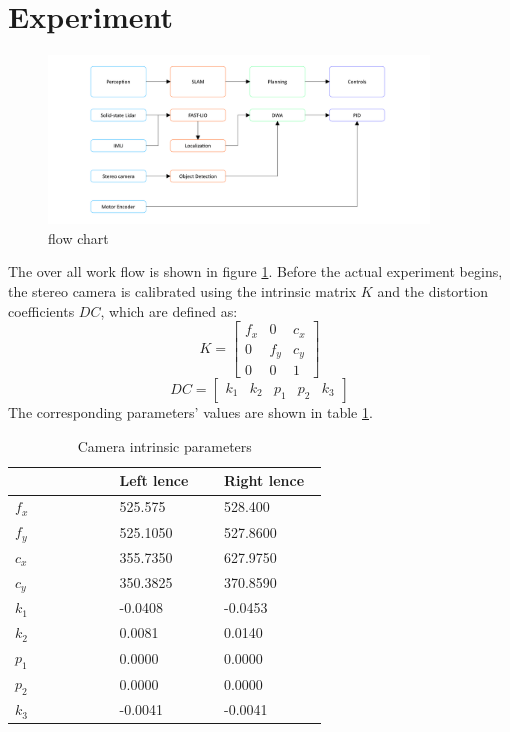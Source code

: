 \documentclass[balance,upint,subscriptcorrection,varvw,nofoot, mathalfa=cal=boondoxo,spanish,french,vietnamese,russian,greek,pdf-a,fontspec,colorlinks]{asmeconf}
\begin{document}
\section{Experiment}
\begin{figure}
	\center
	\includegraphics[width=0.9\textwidth]{flow_chart.png}
	\caption{flow chart}\label{flow}
	\end{figure}
The over all work flow is shown in figure \ref{flow}. Before the actual experiment begins, the stereo camera is calibrated using the intrinsic matrix $K$ and the distortion coefficients $DC$, which are defined as:
\begin{equation}
	K=\left[\begin{array}{ccc}f_{x} & 0 & c_{x} \\ 0 & f_{y} & c_{y} \\ 0 & 0 & 1\end{array}\right]
\end{equation}
\begin{equation}
	DC =\left[\begin{array}{lllll}k_{1} & k_{2} & p_{1} & p_{2} & k_{3}\end{array}\right]
\end{equation}
The corresponding parameters' values are shown in table \ref{calib}.

\begin{table}[!ht]
    \centering
    \begin{tabular}{p{0.3\linewidth} p{0.3\linewidth} p{0.3\linewidth}}
    \hline

	~ & Left lence & Right lence \\ \hline
	$f_x$ & 525.575 & 528.400 \\ 
	$f_y$ & 525.1050 & 527.8600 \\ 
	$c_x$ & 355.7350 & 627.9750 \\ 
	$c_y$ & 350.3825 & 370.8590 \\ 
	$k_1$ & -0.0408 & -0.0453 \\ 
	$k_2$ & 0.0081 & 0.0140 \\ 
	$p_1$ & 0.0000 & 0.0000 \\ 
	$p_2$ & 0.0000 & 0.0000 \\ 
	$k_3$ & -0.0041 & -0.0041 \\ \hline
    \end{tabular}
	\caption{Camera intrinsic parameters}\label{calib}
\end{table}
\end{document}
